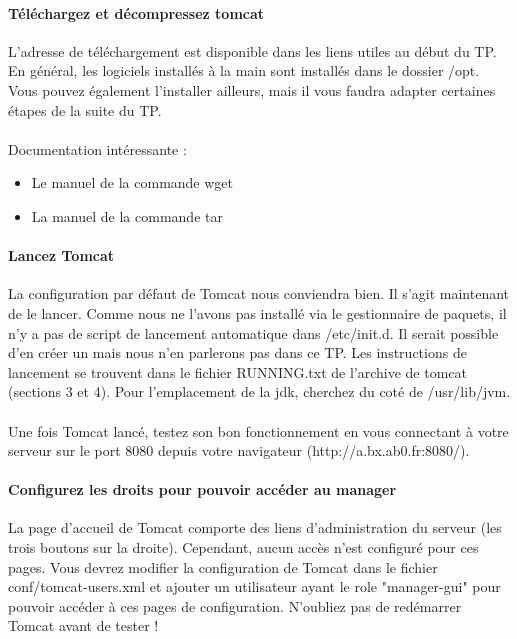 \documentclass[12pt,a4paper]{article}
\begin{document}
\paragraph{Téléchargez et décompressez tomcat\\}
L'adresse de téléchargement est disponible dans les liens utiles au début du TP. En général, les logiciels installés à la main sont installés dans le dossier /opt. Vous pouvez également l'installer ailleurs, mais il vous faudra adapter certaines étapes de la suite du TP.

\paragraph{}
Documentation intéressante : 
\begin{itemize}
\item Le manuel de la commande wget
\item La manuel de la commande tar
\end{itemize}

\paragraph{Lancez Tomcat\\}
La configuration par défaut de Tomcat nous conviendra bien. Il s'agit maintenant de le lancer. Comme nous ne l'avons pas installé via le gestionnaire de paquets, il n'y a pas de script de lancement automatique dans /etc/init.d. Il serait possible d'en créer un mais nous n'en parlerons pas dans ce TP. Les instructions de lancement se trouvent dans le fichier RUNNING.txt de l'archive de tomcat (sections 3 et 4). Pour l'emplacement de la jdk, cherchez du coté de /usr/lib/jvm.

\paragraph{}
Une fois Tomcat lancé, testez son bon fonctionnement en vous connectant à votre serveur sur le port 8080 depuis votre navigateur (http://a.bx.ab0.fr:8080/).

\paragraph{Configurez les droits pour pouvoir accéder au manager\\}
La page d'accueil de Tomcat comporte des liens d'administration du serveur (les trois boutons sur la droite). Cependant, aucun accès n'est configuré pour ces pages. Vous devrez modifier la configuration de Tomcat dans le fichier conf/tomcat-users.xml et ajouter un utilisateur ayant le role "manager-gui" pour pouvoir accéder à ces pages de configuration. N'oubliez pas de redémarrer Tomcat avant de tester !
\end{document}
